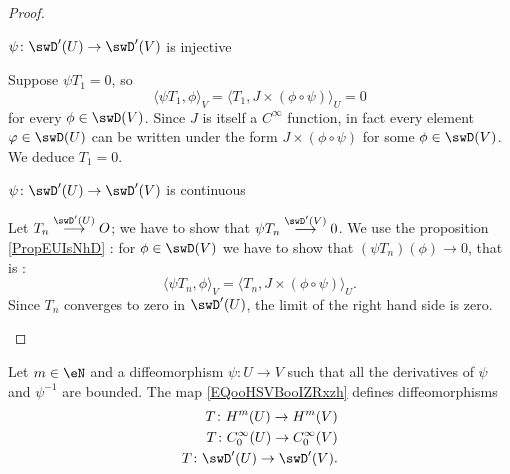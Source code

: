 \begin{proof}
\begin{subproof}
        \item[\( \psi\colon \swD'(U)\to \swD'(V)\) is injective]

            Suppose \( \psi T_1=0\), so
            \begin{equation}
                \langle \psi T_1, \phi\rangle_V =\langle T_1, J\times (\phi\circ\psi)\rangle_U=0
            \end{equation}
            for every \( \phi\in \swD(V)\). Since \( J\) is itself a \(  C^{\infty}\) function, in fact every element \( \varphi\in \swD(U)\) can be written under the form \( J\times (\phi\circ\psi)\) for some \( \phi\in\swD(V)\). We deduce \( T_1=0\).

        \item[\( \psi\colon \swD'(U)\to \swD'(V)\) is continuous]

            Let \( T_n\stackrel{\swD'(U)}{\longrightarrow}O\); we have to show that \( \psi T_n\stackrel{\swD'(V)}{\longrightarrow}0\). We use the proposition \ref{PropEUIsNhD} : for \( \phi\in\swD(V)\) we have to show that \( (\psi T_n)(\phi)\to 0\), that is :
            \begin{equation}
                \langle \psi T_n, \phi\rangle_V=\langle T_n, J\times (\phi\circ\psi)\rangle_U.
            \end{equation}
            Since \( T_n\) converges to zero in \( \swD'(U)\), the limit of the right hand side is zero.

    \end{subproof}

\end{proof}

\begin{proposition}
    Let \( m\in \eN\) and a diffeomorphism \( \psi\colon U\to V\) such that all the derivatives of \( \psi\) and \( \psi^{-1}\) are bounded.  The map \eqref{EQooHSVBooIZRxzh} defines diffeomorphisms
    \begin{subequations}
        \begin{align}
            T\colon H^m(U)\to H^m(V)\\
            T\colon  C^{\infty}_0(U)\to  C^{\infty}_0(V)\\
            T\colon \swD'(U)\to \swD'(V).
        \end{align}
    \end{subequations}
\end{proposition}

